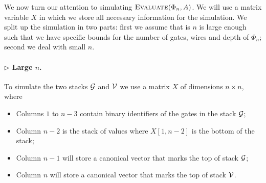 We now turn our attention to simulating $\textsc{Evaluate}(\Phi_n,A)$. We will use a matrix variable $X$
in which we store all necessary information for the simulation. We split up the simulation in two parts:
first we assume that is $n$ is large enough such that we have specific bounds for the number of gates, wires
and depth of $\Phi_n$; second we deal with small $n$.

\paragraph{$\rhd$  Large $n$.}
 To simulate the two stacks $\mathcal{G}$ and $\mathcal{V}$ we use a matrix $X$ of dimensions $n \times n$, where
    \begin{itemize}
        \item Columns $1$ to $n-3$ contain binary identifiers of the gates in the stack $\mathcal{G}$;
        \item Column $n-2$ is the stack of values where $X[1, n-2]$ is the bottom of the stack;
        \item Column $n-1$ will store a canonical vector that marks the top of stack $\mathcal{G}$;
        \item Column $n$ will store a canonical vector that marks the top of stack $\mathcal{V}$.
    \end{itemize}

